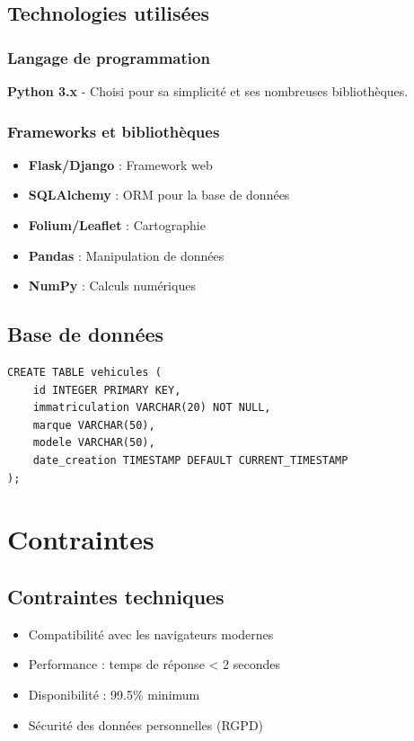 \documentclass[12pt,a4paper]{article}
\begin{document}
\subsection{Technologies utilisées}

\subsubsection{Langage de programmation}
\textbf{Python 3.x} - Choisi pour sa simplicité et ses nombreuses bibliothèques.

\subsubsection{Frameworks et bibliothèques}
\begin{itemize}
    \item \textbf{Flask/Django} : Framework web
    \item \textbf{SQLAlchemy} : ORM pour la base de données
    \item \textbf{Folium/Leaflet} : Cartographie
    \item \textbf{Pandas} : Manipulation de données
    \item \textbf{NumPy} : Calculs numériques
\end{itemize}

\subsection{Base de données}

\lipsum[10]

\begin{lstlisting}[caption=Exemple de structure de table véhicule]
CREATE TABLE vehicules (
    id INTEGER PRIMARY KEY,
    immatriculation VARCHAR(20) NOT NULL,
    marque VARCHAR(50),
    modele VARCHAR(50),
    date_creation TIMESTAMP DEFAULT CURRENT_TIMESTAMP
);
\end{lstlisting}

\section{Contraintes}

\subsection{Contraintes techniques}

\begin{itemize}
    \item Compatibilité avec les navigateurs modernes
    \item Performance : temps de réponse < 2 secondes
    \item Disponibilité : 99.5\% minimum
    \item Sécurité des données personnelles (RGPD)
\end{itemize}
\end{document}
